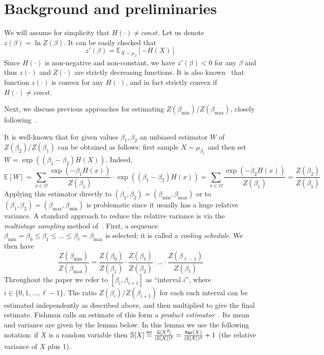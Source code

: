 \documentclass[final,12pt]{colt2018}
\newcommand{\eqdef}{{\stackrel{\mbox{\tiny \tt ~def~}}{=}}}
\def\bmin{{\beta_{\min}}}
\def\bmax{{\beta_{\max}}}
\def\E{{\mathbb E}}
\def\Vrel(#1){{{\mathbb S}[{#1}]}}
\begin{document}
\section{Background and preliminaries}
We will assume for simplicity that $H(\cdot)\ne const$.
Let us denote $z(\beta)=\ln Z(\beta)$. It can be easily checked that
$$
z'(\beta)=\E_{X\sim\mu_\beta} [ -H(X)]
$$
Since $H(\cdot)$ is non-negative and non-constant, we have $z'(\beta)<0$ for any $\beta$ and thus $z(\cdot)$ and $Z(\cdot)$ are
strictly decreasing functions. It is also known~\cite[Proposition 3.1]{WainwrightJordan} that function $z(\cdot)$ is convex for any $H(\cdot)$,
and in fact strictly convex if  $H(\cdot)\ne const$.

Next, we discuss previous approaches for estimating $Z(\bmin)/Z(\bmax)$,
closely following~\cite{Huber:Gibbs}. %

It is well-known that for given values $\beta_1,\beta_2$ an unbiased estimator $W$ of $Z(\beta_2)/Z(\beta_1)$
can be obtained as follows: first sample $X\sim\mu_{\beta_1}$ and then set $W=\exp((\beta_1-\beta_2)H(X))$. Indeed,
$$
\E[W]=\sum_{x\in\Omega}\frac{\exp(-\beta_1 H(x))}{Z(\beta_1)}\cdot\exp((\beta_1-\beta_2)H(x))
=\sum_{x\in\Omega}\frac{\exp(-\beta_2 H(x))}{Z(\beta_1)}
=\frac{Z(\beta_2)}{Z(\beta_1)}
$$
Applying this estimator directly to $(\beta_1,\beta_2)=(\bmin,\bmax)$ or to $(\beta_1,\beta_2)=(\bmax,\bmin)$ is problematic since it usually
has a huge relative variance. A standard approach to reduce the relative variance is  via  the {\em multistage sampling} method
of~\cite{ValleauCard}. First, a sequence $\bmin=\beta_0\le \beta_1\le \ldots\le\beta_\ell=\bmax$ is selected; it
is called a {\em cooling schedule}.
We then have
\begin{equation*}
\frac{Z(\bmin)}{Z(\bmax)}=\frac{Z(\beta_0)}{Z(\beta_1)}\cdot \frac{Z(\beta_1)}{Z(\beta_2)}\cdot\ldots\cdot \frac{Z(\beta_{\ell-1})}{Z(\beta_{\ell})}
\end{equation*}
Throughout the paper we refer to $[\beta_{i},\beta_{i+1}]$ as ``interval $i$'', where $i\in\{0,1,\ldots,\ell-1\}$.
The ratio $Z(\beta_{i})/Z(\beta_{i+1})$ for each such interval can be estimated independently as described above,
and then multiplied to give the final estimate. Fishman calls an estimate of this form
a {\em product estimator}~\citep{Fishman:94}.
Its mean and variance are given by the lemma below.
In this lemma  we use the following notation:
if $X$ is a random variable then  $\Vrel(X)\eqdef\frac{\E[X^2]}{(\E[X])^2}=\frac{{\tt Var}(X)}{(\E[X])^2}+1$
(the relative variance of $X$ plus 1).
\end{document}
